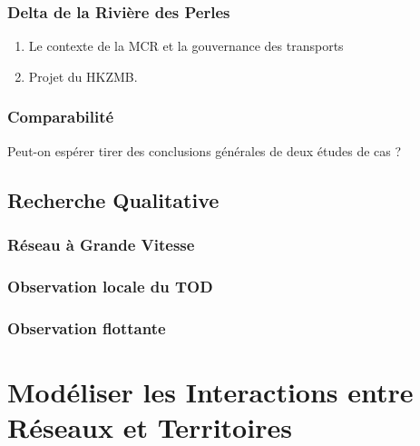 



\subsubsection{Delta de la Rivière des Perles}


\begin{enumerate}
	\item Le contexte de la MCR et la gouvernance des transports
	\item Projet du HKZMB.
\end{enumerate}

\subsubsection{Comparabilité}

Peut-on espérer tirer des conclusions générales de deux études de cas ?




\subsection{Recherche Qualitative}

\subsubsection{Réseau à Grande Vitesse}



\subsubsection{Observation locale du TOD}



\subsubsection{Observation flottante}






\section{Modéliser les Interactions entre Réseaux et Territoires}

